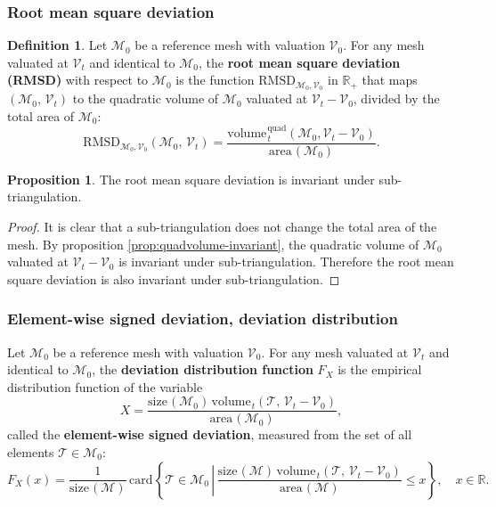 \documentclass{article}
\theoremstyle{definition}
\newtheorem{defn}{Definition}
\newtheorem{prop}{Proposition}
\newcommand{\RR}{\mathbb{R}}
\newcommand{\MM}{\mathcal{M}}
\newcommand{\VV}{\mathcal{V}}
\newcommand{\TT}{\mathcal{T}}
\newcommand{\area}{\mathrm{area}\hspace{1pt}}
\newcommand{\size}{\mathrm{size}\hspace{1pt}}
\newcommand{\vol}{\mathrm{volume\hspace{1pt}}}
\newcommand{\card}{\mathrm{card\hspace{1pt}}}
\newcommand{\quadvol}{\mathrm{volume\hspace{1pt}}^\mathrm{quad}}
\begin{document}
\subsubsection{Root mean square deviation}
\begin{defn}
Let $\MM_0$ be a reference mesh with valuation $\VV_0$. For any mesh valuated at $\VV_t$ and identical to $\MM_0$, the \textbf{root mean square deviation (RMSD)} with respect to $\MM_0$ is the function  $\mathrm{RMSD}_{\MM_0,\VV_0}$ in $\RR_+$ that maps $(\MM_0,\,\VV_t)$ to the quadratic volume of $\MM_0$ valuated at $\VV_t-\VV_0$, divided by the total area of $\MM_0$:
\[\mathrm{RMSD}_{\MM_0,\VV_0} (\MM_0,\,\VV_t) = \frac{\quadvol_t(\MM_0, \VV_t-\VV_0)}{\area(\MM_0)}.\]
\end{defn}

\begin{prop}
The root mean square deviation is invariant under sub-triangulation.
\end{prop}
\begin{proof}[Proof]
It is clear that a sub-triangulation does not change the total area of the mesh.
By proposition \ref{prop:quadvolume-invariant}, the quadratic volume of $\MM_0$ valuated at $\VV_t-\VV_0$ is invariant under sub-triangulation. Therefore the root mean square deviation is also invariant under sub-triangulation.
\end{proof}




\subsubsection{Element-wise signed deviation, deviation distribution}
Let $\MM_0$ be a reference mesh with valuation $\VV_0$. For any mesh valuated at $\VV_t$ and identical to $\MM_0$, the \textbf{deviation distribution function} $F_X$ is the empirical distribution function of the variable 
\[X = \frac{\size(\MM_0)\,\vol_t(\TT,\,\VV_t-\VV_0)}{\area(\MM_0)},\] 
called the \textbf{element-wise signed deviation}, measured from the set of all elements $\TT\in\MM_0$:
\[F_X(x) = \frac{1}{\size(\MM)}\, \card \left\{   \TT\in\MM_0 \,\left|\,
\frac{\size(\MM)\,\vol_t(\TT,\,\VV_t-\VV_0)}{\area(\MM)}\right. \leqslant x \right\},
\quad x\in\RR.\]
\end{document}
